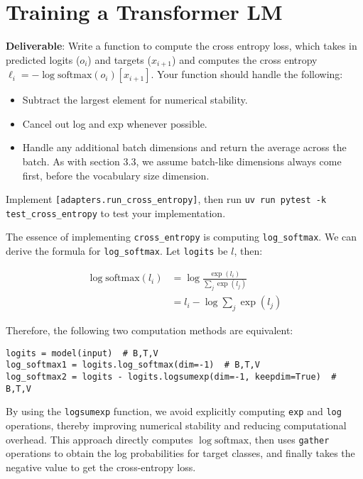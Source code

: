 \section{Training a Transformer LM}


\textbf{Deliverable}: Write a function to compute the cross entropy loss, which takes in predicted logits ($o_i$) and targets ($x_{i+1}$) and computes the cross entropy $\ell_i = -\log \text{softmax}(o_i)[x_{i+1}]$. Your function should handle the following:

\begin{itemize}
    \item Subtract the largest element for numerical stability.
    \item Cancel out log and exp whenever possible.
    \item Handle any additional batch dimensions and return the average across the batch. As with section 3.3, we assume batch-like dimensions always come first, before the vocabulary size dimension.
\end{itemize}

Implement \lstinline{[adapters.run_cross_entropy]}, then run \lstinline{uv run pytest -k test_cross_entropy} to test your implementation.

\begin{answer}
The essence of implementing \lstinline{cross_entropy} is computing \lstinline{log_softmax}. We can derive the formula for \lstinline{log_softmax}. Let \lstinline{logits} be $l$, then:

\begin{equation*}
\begin{aligned}
\log \mathrm{softmax}(l_i) &= \log \frac{\exp(l_i)}{\sum_j \exp(l_j)} \\
&= l_i - \log \sum_j \exp(l_j)
\end{aligned}
\end{equation*}

Therefore, the following two computation methods are equivalent:

\begin{lstlisting}
logits = model(input)  # B,T,V
log_softmax1 = logits.log_softmax(dim=-1)  # B,T,V
log_softmax2 = logits - logits.logsumexp(dim=-1, keepdim=True)  # B,T,V
\end{lstlisting}

By using the \lstinline{logsumexp} function, we avoid explicitly computing \lstinline{exp} and \lstinline{log} operations, thereby improving numerical stability and reducing computational overhead. This approach directly computes $\log \mathrm{softmax}$, then uses \lstinline{gather} operations to obtain the log probabilities for target classes, and finally takes the negative value to get the cross-entropy loss.
\end{answer}

